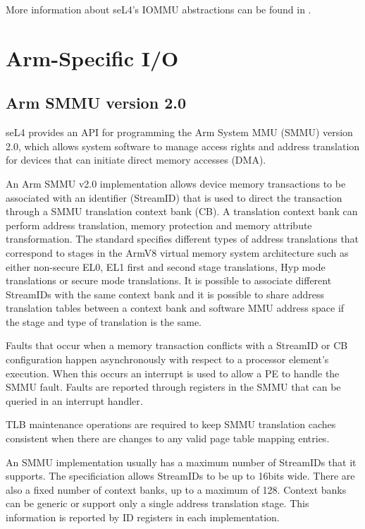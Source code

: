More information about seL4's IOMMU abstractions can be found in \cite{Palande:M}.
\fi

\section{Arm-Specific I/O}

\subsection{Arm SMMU version 2.0}
\label{sec:smmuv2}


seL4 provides an API for programming the Arm System MMU (SMMU) version 2.0,
which allows system software to manage access rights and address translation for
devices that can initiate direct memory accesses (DMA).

An Arm SMMU v2.0 implementation allows device memory transactions to be associated
with an identifier (StreamID) that is used to direct the transaction through a
SMMU translation context bank (CB). A translation context bank can perform
address translation, memory protection and memory attribute transformation.
The standard specifies different types of address translations that correspond
to stages in the ArmV8 virtual memory system architecture such as either 
non-secure  EL0, EL1 first and second stage translations, Hyp mode translations
or secure mode translations. It is possible to associate different StreamIDs
with the same context bank and it is possible to share address translation
tables between a context bank and software MMU address space if the stage and type
of translation is the same.

Faults that occur when a memory transaction conflicts with a StreamID or CB
configuration happen asynchronously with respect to a processor element's
execution. When this occurs an interrupt is used to allow a PE to handle the
SMMU fault. Faults are reported through registers in the SMMU that can be
queried in an interrupt handler.

TLB maintenance operations are required to keep SMMU translation caches
consistent when there are changes to any valid page table mapping entries.

An SMMU implementation usually has a maximum number of StreamIDs that it supports.
The specificiation allows StreamIDs to be up to 16bits wide. There are also a
fixed number of context banks, up to a maximum of 128. Context banks can
be generic or support only a single address translation stage. This information
is reported by ID registers in each implementation.

